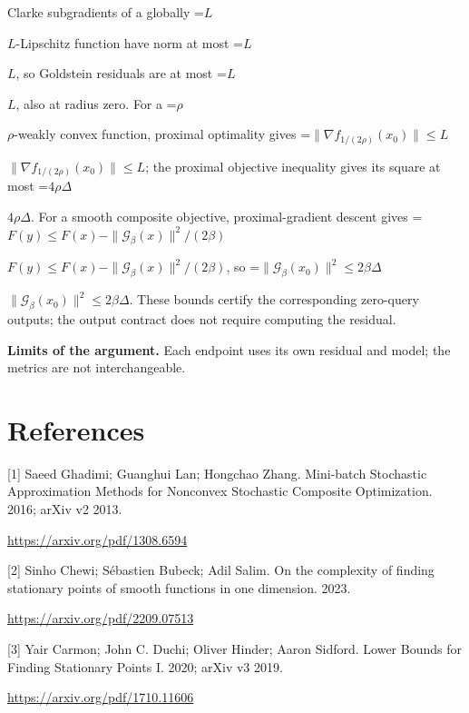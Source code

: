 \documentclass[10pt,a4paper]{article}
\newcommand{\AtlasMath}[1]{\par\begingroup\centering\setbox0=\hbox{$\displaystyle #1$}\ifdim\wd0>1.4\linewidth\typeout{ATLAS WIDE FORMULA: \the\wd0}\fi\ifdim\wd0>\linewidth\resizebox{\linewidth}{!}{\box0}\else\box0\fi\par\endgroup}
\newcommand{\AtlasInlineMath}[1]{\begingroup\setbox0=\hbox{$#1$}\ifdim\wd0>.4\linewidth\endgroup\AtlasMath{#1}\else\endgroup$#1$\fi}
\begin{document}
Clarke subgradients of a globally \AtlasInlineMath{L}-Lipschitz function have norm at most \AtlasInlineMath{L}, so Goldstein residuals are at most \AtlasInlineMath{L}, also at radius zero. For a \AtlasInlineMath{\rho}-weakly convex function, proximal optimality gives
\AtlasInlineMath{\|\nabla f_{1/(2\rho)}(x_0)\|\le L}; the proximal objective inequality gives its square at most \AtlasInlineMath{4\rho\Delta}.
For a smooth composite objective, proximal-gradient descent gives
\AtlasInlineMath{F(y)\le F(x)-\|\mathcal G_\beta(x)\|^2/(2\beta)},
so \AtlasInlineMath{\|\mathcal G_\beta(x_0)\|^2\le2\beta\Delta}.
These bounds certify the corresponding zero-query outputs; the output contract does not require computing the residual.

\textbf{Limits of the argument.} Each endpoint uses its own residual and model; the metrics are not interchangeable.

\section{References}
[1] Saeed Ghadimi; Guanghui Lan; Hongchao Zhang. Mini-batch Stochastic Approximation Methods for Nonconvex Stochastic Composite Optimization. 2016; arXiv v2 2013.

\url{https://arxiv.org/pdf/1308.6594}

[2] Sinho Chewi; Sébastien Bubeck; Adil Salim. On the complexity of finding stationary points of smooth functions in one dimension. 2023.

\url{https://arxiv.org/pdf/2209.07513}

[3] Yair Carmon; John C. Duchi; Oliver Hinder; Aaron Sidford. Lower Bounds for Finding Stationary Points I. 2020; arXiv v3 2019.

\url{https://arxiv.org/pdf/1710.11606}
\end{document}
